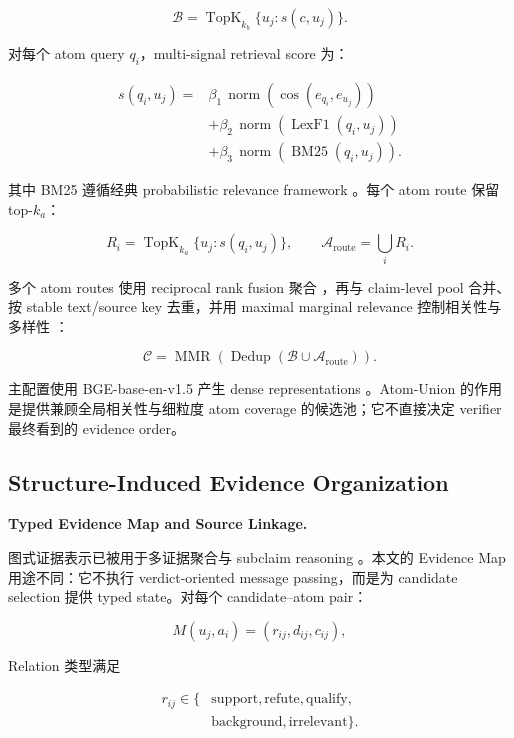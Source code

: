 \documentclass[letterpaper]{article}
\begin{document}
\[
\mathcal B=\operatorname{TopK}_{k_b}\{u_j:s(c,u_j)\}.
\]

对每个 atom query $q_i$，multi-signal retrieval score 为：

\[
\begin{aligned}
s(q_i,u_j)
={}&\beta_1\,\operatorname{norm}(\cos(e_{q_i},e_{u_j}))\\
&+\beta_2\,\operatorname{norm}(\operatorname{LexF1}(q_i,u_j))\\
&+\beta_3\,\operatorname{norm}(\operatorname{BM25}(q_i,u_j)).
\end{aligned}
\]

其中 BM25 遵循经典 probabilistic relevance framework \citep{Robertson2009BM25}。每个 atom route 保留 top-$k_a$：

\[
R_i=\operatorname{TopK}_{k_a}\{u_j:s(q_i,u_j)\},\qquad
\mathcal A_{\mathrm{route}}=\bigcup_i R_i.
\]

多个 atom routes 使用 reciprocal rank fusion 聚合 \citep{Cormack2009RRF}，再与 claim-level pool 合并、按 stable text/source key 去重，并用 maximal marginal relevance 控制相关性与多样性 \citep{Goldstein1998MMR}：

\[
\mathcal C=\operatorname{MMR}\!\left(\operatorname{Dedup}(\mathcal B\cup\mathcal A_{\mathrm{route}})\right).
\]

主配置使用 BGE-base-en-v1.5 产生 dense representations \citep{Xiao2023BGE}。Atom-Union 的作用是提供兼顾全局相关性与细粒度 atom coverage 的候选池；它不直接决定 verifier 最终看到的 evidence order。

\subsection{Structure-Induced Evidence Organization}

\textbf{Typed Evidence Map and Source Linkage.}

图式证据表示已被用于多证据聚合与 subclaim reasoning \citep{Zhou2019GEAR,Liu2019KGAT,Wang2026GDefense,Lourenco2026KGCRAFT}。本文的 Evidence Map 用途不同：它不执行 verdict-oriented message passing，而是为 candidate selection 提供 typed state。对每个 candidate--atom pair：

\[
M(u_j,a_i)=(r_{ij},d_{ij},c_{ij}),
\]

Relation 类型满足

\[
\begin{aligned}
r_{ij}\in\{&\text{support},\text{refute},\text{qualify},\\
             &\text{background},\text{irrelevant}\}.
\end{aligned}
\]
\end{document}
